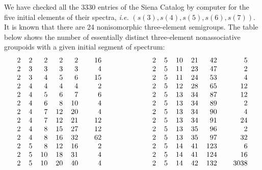 \documentclass[a4paper,reqno]{amsart}\usepackage{amssymb,latexsym}
\theoremstyle{definition}
\theoremstyle{remark}
\numberwithin{equation}{section}
\numberwithin{theorem}{section}
\begin{document}
We have checked all the 3330 entries of the Siena Catalog by computer for the
five initial elements of their spectra, \textit{i.e.}
$(s(3),s(4),s(5),s(6),s(7))$. It is known that there are 24 nonisomorphic
three-element semigroups. The table below shows the number of essentially
distinct three-element nonassociative groupoids with a given initial segment
of spectrum:
\[
 \setlength{\tabcolsep}{0.2cm}\begin{tabular}
[c]{rrrrrrr}$2$ & $2$ & $2$ & $2$ & $2$ &  & $16$\\
$2$ & $3$ & $3$ & $3$ & $3$ &  & $4$\\
$2$ & $3$ & $4$ & $5$ & $6$ &  & $15$\\
$2$ & $4$ & $4$ & $4$ & $4$ &  & $2$\\
$2$ & $4$ & $5$ & $6$ & $7$ &  & $6$\\
$2$ & $4$ & $6$ & $8$ & $10$ &  & $4$\\
$2$ & $4$ & $7$ & $12$ & $20$ &  & $4$\\
$2$ & $4$ & $7$ & $12$ & $21$ &  & $12$\\
$2$ & $4$ & $8$ & $15$ & $27$ &  & $12$\\
$2$ & $4$ & $8$ & $16$ & $32$ &  & $62$\\
$2$ & $5$ & $8$ & $12$ & $16$ &  & $2$\\
$2$ & $5$ & $10$ & $18$ & $31$ &  & $4$\\
$2$ & $5$ & $10$ & $20$ & $40$ &  & $4$\end{tabular}
\qquad\qquad\qquad\begin{tabular}
[c]{rrrrrrr}$2$ & $5$ & $10$ & $21$ & $42$ &  & $5$\\
$2$ & $5$ & $11$ & $23$ & $47$ &  & $2$\\
$2$ & $5$ & $11$ & $24$ & $53$ &  & $4$\\
$2$ & $5$ & $12$ & $28$ & $65$ &  & $12$\\
$2$ & $5$ & $13$ & $34$ & $87$ &  & $12$\\
$2$ & $5$ & $13$ & $34$ & $89$ &  & $2$\\
$2$ & $5$ & $13$ & $34$ & $90$ &  & $4$\\
$2$ & $5$ & $13$ & $34$ & $91$ &  & $24$\\
$2$ & $5$ & $13$ & $35$ & $96$ &  & $2$\\
$2$ & $5$ & $13$ & $35$ & $97$ &  & $32$\\
$2$ & $5$ & $14$ & $41$ & $123$ &  & $6$\\
$2$ & $5$ & $14$ & $41$ & $124$ &  & $16$\\
$2$ & $5$ & $14$ & $42$ & $132$ &  & $3038$\end{tabular}
\]
\end{document}
